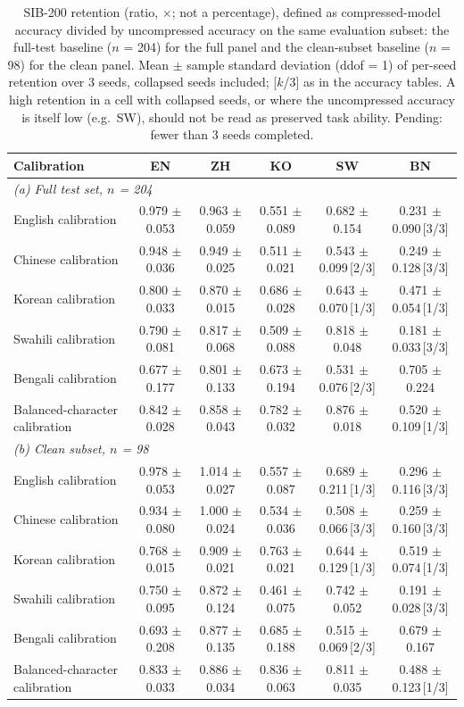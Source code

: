 \begin{table}[t]
\centering
\small
\begin{tabular}{lccccc}
\toprule
Calibration & EN & ZH & KO & SW & BN \\
\midrule
\multicolumn{6}{l}{\textit{(a) Full test set, $n$ = 204}} \\
English calibration & 0.979 $\pm$ 0.053 & 0.963 $\pm$ 0.059 & 0.551 $\pm$ 0.089 & 0.682 $\pm$ 0.154 & 0.231 $\pm$ 0.090\,[3/3] \\
Chinese calibration & 0.948 $\pm$ 0.036 & 0.949 $\pm$ 0.025 & 0.511 $\pm$ 0.021 & 0.543 $\pm$ 0.099\,[2/3] & 0.249 $\pm$ 0.128\,[3/3] \\
Korean calibration & 0.800 $\pm$ 0.033 & 0.870 $\pm$ 0.015 & 0.686 $\pm$ 0.028 & 0.643 $\pm$ 0.070\,[1/3] & 0.471 $\pm$ 0.054\,[1/3] \\
Swahili calibration & 0.790 $\pm$ 0.081 & 0.817 $\pm$ 0.068 & 0.509 $\pm$ 0.088 & 0.818 $\pm$ 0.048 & 0.181 $\pm$ 0.033\,[3/3] \\
Bengali calibration & 0.677 $\pm$ 0.177 & 0.801 $\pm$ 0.133 & 0.673 $\pm$ 0.194 & 0.531 $\pm$ 0.076\,[2/3] & 0.705 $\pm$ 0.224 \\
Balanced-character calibration & 0.842 $\pm$ 0.028 & 0.858 $\pm$ 0.043 & 0.782 $\pm$ 0.032 & 0.876 $\pm$ 0.018 & 0.520 $\pm$ 0.109\,[1/3] \\
\midrule
\multicolumn{6}{l}{\textit{(b) Clean subset, $n$ = 98}} \\
English calibration & 0.978 $\pm$ 0.053 & 1.014 $\pm$ 0.027 & 0.557 $\pm$ 0.087 & 0.689 $\pm$ 0.211\,[1/3] & 0.296 $\pm$ 0.116\,[3/3] \\
Chinese calibration & 0.934 $\pm$ 0.080 & 1.000 $\pm$ 0.024 & 0.534 $\pm$ 0.036 & 0.508 $\pm$ 0.066\,[3/3] & 0.259 $\pm$ 0.160\,[3/3] \\
Korean calibration & 0.768 $\pm$ 0.015 & 0.909 $\pm$ 0.021 & 0.763 $\pm$ 0.021 & 0.644 $\pm$ 0.129\,[1/3] & 0.519 $\pm$ 0.074\,[1/3] \\
Swahili calibration & 0.750 $\pm$ 0.095 & 0.872 $\pm$ 0.124 & 0.461 $\pm$ 0.075 & 0.742 $\pm$ 0.052 & 0.191 $\pm$ 0.028\,[3/3] \\
Bengali calibration & 0.693 $\pm$ 0.208 & 0.877 $\pm$ 0.135 & 0.685 $\pm$ 0.188 & 0.515 $\pm$ 0.069\,[2/3] & 0.679 $\pm$ 0.167 \\
Balanced-character calibration & 0.833 $\pm$ 0.033 & 0.886 $\pm$ 0.034 & 0.836 $\pm$ 0.063 & 0.811 $\pm$ 0.035 & 0.488 $\pm$ 0.123\,[1/3] \\
\bottomrule
\end{tabular}
\caption{SIB-200 retention (ratio, $\times$; not a percentage), defined as compressed-model accuracy divided by uncompressed accuracy on the same evaluation subset: the full-test baseline ($n$ = 204) for the full panel and the clean-subset baseline ($n$ = 98) for the clean panel. Mean $\pm$ sample standard deviation (ddof = 1) of per-seed retention over 3 seeds, collapsed seeds included; [$k$/3] as in the accuracy tables. A high retention in a cell with collapsed seeds, or where the uncompressed accuracy is itself low (e.g.\ SW), should not be read as preserved task ability. Pending: fewer than 3 seeds completed.}
\label{tab:sib-retention}
\end{table}
